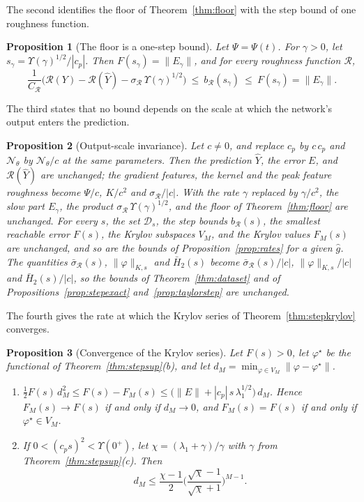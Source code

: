 \documentclass[11pt]{article}
\newtheorem{proposition}{Proposition}
\theoremstyle{definition}
\theoremstyle{remark}
\newcommand{\Net}{\mathcal{N}_\theta}    %
\newcommand{\Rgh}{\mathcal{R}}           %
\newcommand{\sR}{\sigma_{\Rgh}}
\newcommand{\CR}{C_{\Rgh}}
\begin{document}
The second identifies the floor of Theorem~\ref{thm:floor} with the step bound of one roughness function.

\begin{proposition}[The floor is a one-step bound]\label{prop:floorstep}
Let $\Psi = \Psi(t)$.
For $\gamma > 0$, let $s_\gamma = \Upsilon(\gamma)^{1/2}/|c_p|$. Then $F(s_\gamma) = \|E_\gamma\|$, and for every roughness function $\Rgh$,
\begin{equation}\label{eq:floorstep}
\frac{1}{\CR}\Big(\Rgh(Y) - \Rgh(\hat Y) - \sR\,\Upsilon(\gamma)^{1/2}\Big) \ \le\ b_\Rgh(s_\gamma) \ \le\ F(s_\gamma) = \|E_\gamma\|.
\end{equation}
\end{proposition}

The third states that no bound depends on the scale at which the network's output enters the prediction.

\begin{proposition}[Output-scale invariance]\label{prop:scale}
Let $c \neq 0$, and replace $c_p$ by $c\,c_p$ and $\Net$ by $\Net/c$ at the same parameters.
Then the prediction $\hat Y$, the error $E$, and $\Rgh(\hat Y)$ are unchanged; the gradient features, the kernel and the peak feature roughness become $\Psi/c$, $K/c^2$ and $\sR/|c|$.
With the rate $\gamma$ replaced by $\gamma/c^2$, the slow part $E_\gamma$, the product $\sR\,\Upsilon(\gamma)^{1/2}$, and the floor of Theorem~\ref{thm:floor} are unchanged.
For every $s$, the set $\mathcal{D}_s$, the step bounds $b_\Rgh(s)$, the smallest reachable error $F(s)$, the Krylov subspaces $V_M$, and the Krylov values $F_M(s)$ are unchanged, and so are the bounds of Proposition~\ref{prop:rates} for a given $\hat g$.
The quantities $\bar\sigma_\Rgh(s)$, $\|\varphi\|_{K,s}$ and $\bar H_2(s)$ become $\bar\sigma_\Rgh(s)/|c|$, $\|\varphi\|_{K,s}/|c|$ and $\bar H_2(s)/|c|$, so the bounds of Theorem~\ref{thm:dataset} and of Propositions~\ref{prop:stepexact} and~\ref{prop:taylorstep} are unchanged.
\end{proposition}

The fourth gives the rate at which the Krylov series of Theorem~\ref{thm:stepkrylov} converges.

\begin{proposition}[Convergence of the Krylov series]\label{prop:krylovrate}
Let $F(s) > 0$, let $\varphi^\star$ be the functional of Theorem~\ref{thm:stepsup}(b), and let $d_M = \min_{\varphi\in V_M}\|\varphi - \varphi^\star\|$.
\begin{enumerate}[label=(\alph*)]
\item $\tfrac12 F(s)\,d_M^2 \le F(s) - F_M(s) \le \big(\|E\| + |c_p|\,s\,\lambda_1^{1/2}\big)\,d_M$. Hence $F_M(s) \to F(s)$ if and only if $d_M \to 0$, and $F_M(s) = F(s)$ if and only if $\varphi^\star \in V_M$.
\item If $0 < (c_ps)^2 < \Upsilon(0^+)$, let $\chi = (\lambda_1+\gamma)/\gamma$ with $\gamma$ from Theorem~\ref{thm:stepsup}(c). Then
\begin{equation}\label{eq:krylovratestep}
d_M \le \frac{\chi-1}{2}\Big(\frac{\sqrt\chi-1}{\sqrt\chi+1}\Big)^{M-1}.
\end{equation}
\end{enumerate}
\end{proposition}
\end{document}
